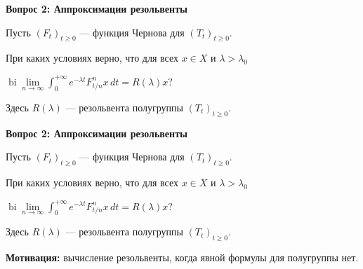 \documentclass[11pt]{article}
\begin{document}
\begin{center}
{\color{notaeYELLOW}\bfseries\fontsize{44}{52}\selectfont Вопрос 2: Аппроксимации резольвенты}
\end{center}
\vspace*{\fill}
\begin{center}
\fontsize{36}{43}\selectfont
\parbox{\linewidth}{\centering\noindent Пусть $(F_t)_{t\ge0}$ --- функция Чернова для $(T_t)_{t\ge0}$.
\par}\vspace{0.4in}
\parbox{\linewidth}{\centering\noindent При каких условиях верно, что для всех $x\in X$ и $\lambda>\lambda_0$
\par}\vspace{0.4in}
\parbox{\linewidth}{\centering\noindent $\operatorname{bi}\lim\limits_{n\to\infty}\int_0^{+\infty}e^{-\lambda t}F_{t/n}^n x\,dt=R(\lambda)x?$
\par}\vspace{0.4in}
\parbox{\linewidth}{\centering\noindent Здесь $R(\lambda)$ --- резольвента полугруппы $(T_t)_{t\ge0}$.
\par}\vspace{0.4in}
\end{center}
\vspace*{\fill}

\newpage

\begin{center}
{\color{notaeYELLOW}\bfseries\fontsize{44}{52}\selectfont Вопрос 2: Аппроксимации резольвенты}
\end{center}
\vspace*{\fill}
\begin{center}
\fontsize{36}{43}\selectfont
\parbox{\linewidth}{\centering\noindent Пусть $(F_t)_{t\ge0}$ --- функция Чернова для $(T_t)_{t\ge0}$.
\par}\vspace{0.4in}
\parbox{\linewidth}{\centering\noindent При каких условиях верно, что для всех $x\in X$ и $\lambda>\lambda_0$
\par}\vspace{0.4in}
\parbox{\linewidth}{\centering\noindent $\operatorname{bi}\lim\limits_{n\to\infty}\int_0^{+\infty}e^{-\lambda t}F_{t/n}^n x\,dt=R(\lambda)x?$
\par}\vspace{0.4in}
\parbox{\linewidth}{\centering\noindent Здесь $R(\lambda)$ --- резольвента полугруппы $(T_t)_{t\ge0}$.
\par}\vspace{0.4in}
\parbox{\linewidth}{\centering\noindent \textbf{Мотивация:} вычисление резольвенты, когда явной формулы для полугруппы нет.
\par}\vspace{0.4in}
\end{center}
\vspace*{\fill}
\end{document}
